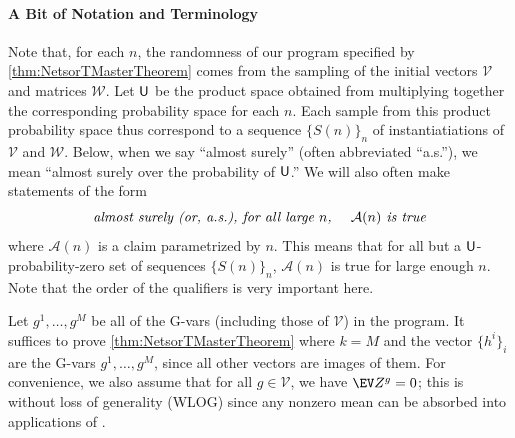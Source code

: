\documentclass[main.tex]{subfiles}
\begin{document}
\paragraph{A Bit of Notation and Terminology}
Note that, for each $n$, the randomness of our program specified by \cref{thm:NetsorTMasterTheorem} comes from the sampling of the initial vectors $\mathcal V$ and matrices $\mathcal W$.
Let $\mathsf{U}$ be the product space obtained from multiplying together the corresponding probability space for each $n$.
Each sample from this product probability space thus correspond to a sequence $\{S(n)\}_n$ of instantiatiations of $\mathcal V$ and $\mathcal W$.
Below, when we say ``almost surely'' (often abbreviated ``a.s.''), we mean ``almost surely over the probability of $\mathsf{U}{}$.''
We will also often make statements of the form 
\begin{equation*}
\text{\emph{almost surely (or, a.s.), for all large $n$, \quad $\mathcal A(n)$ is true}}
\end{equation*}
where $\mathcal A(n)$ is a claim parametrized by $n$.
This means that for all but a $\mathsf{U}{}$-probability-zero set of sequences $\{S(n)\}_n$, $\mathcal A(n)$ is true for large enough $n$.
Note that the order of the qualifiers is very important here.

Let $g^1, \ldots, g^M$ be all of the G-vars (including those of $\mathcal V$) in the program.
It suffices to prove \cref{thm:NetsorTMasterTheorem} where $k=M$ and the vector $\{h^i\}_i$ are the G-vars $g^1, \ldots, g^M$, since all other vectors are  images of them.
For convenience, we also assume that for all $g\in \mathcal V$, we have $\EV Z^g = 0$; this is without loss of generality (WLOG) since any nonzero mean can be absorbed into applications of .
\end{document}
